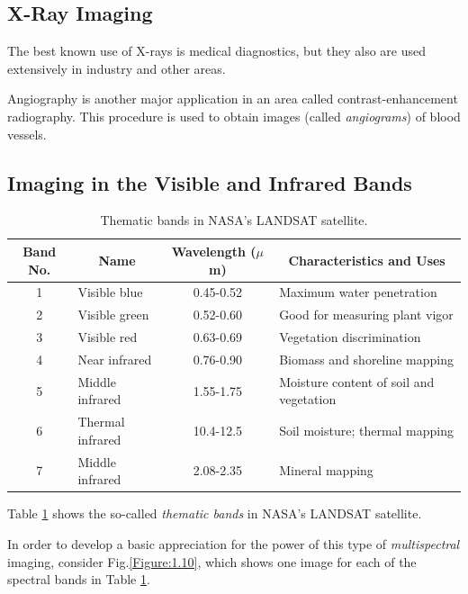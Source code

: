 \documentclass[a4paper,10pt,twoside]{book}
\begin{document}
\subsection{X-Ray Imaging}

The best known use of X-rays is medical diagnostics, but they also are used extensively in industry and other areas.

Angiography is another major application in an area called contrast-enhancement radiography. This procedure is used to obtain images (called \textit{angiograms}) of blood vessels.

\subsection{Imaging in the Visible and Infrared Bands}

\begin{table}[htbp]
    \centering
    \begin{tabular}{|clcl|}
        \hline
        \textbf{Band No.}&\multicolumn{1}{c}{\textbf{Name}}&\textbf{Wavelength ($\mu$m)}&\multicolumn{1}{c}{\textbf{Characteristics and Uses}}\vline\\ \hline
        1&Visible blue&0.45-0.52&Maximum water penetration\\
        2&Visible green&0.52-0.60&Good for measuring plant vigor\\
        3&Visible red&0.63-0.69&Vegetation discrimination\\
        4&Near infrared&0.76-0.90&Biomass and shoreline mapping\\
        5&Middle infrared&1.55-1.75&Moisture content of soil and vegetation\\
        6&Thermal infrared&10.4-12.5&Soil moisture; thermal mapping\\
        7&Middle infrared&2.08-2.35&Mineral mapping\\
        \hline
    \end{tabular}
    \caption{Thematic bands in NASA's LANDSAT satellite.}
    \label{Table:1.1}
\end{table}

Table \ref{Table:1.1} shows the so-called \textit{thematic bands} in NASA's LANDSAT satellite.

In order to develop a basic appreciation for the power of this type of \textit{multispectral} imaging, consider Fig.\;\ref{Figure:1.10}, which shows one image for each of the spectral bands in Table \ref{Table:1.1}.
\end{document}
